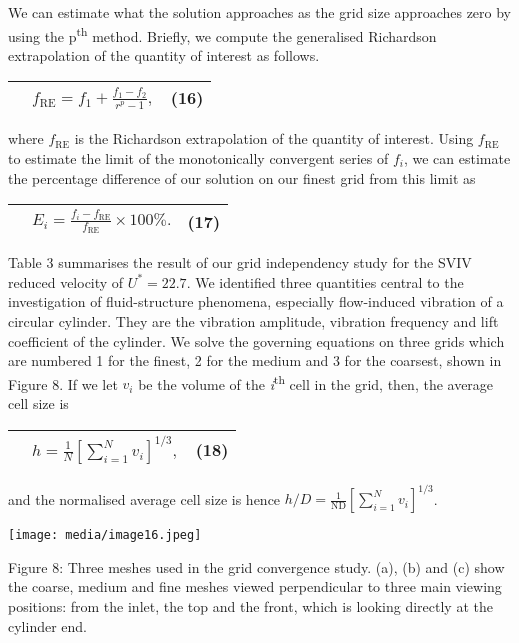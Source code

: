 \documentclass[]{article}
\begin{document}
We can estimate what the solution approaches as the grid size approaches
zero by using the p\textsuperscript{th} method. Briefly, we compute the
generalised Richardson extrapolation of the quantity of interest as
follows.

\begin{longtable}[]{@{}lll@{}}
\toprule
& \(f_{\text{RE}} = f_{1} + \frac{f_{1} - f_{2}}{r^{p} - 1},\) &
(16)\tabularnewline
\midrule
\endhead
\bottomrule
\end{longtable}

where \(f_{\text{RE}}\) is the Richardson extrapolation of the quantity
of interest. Using \(f_{\text{RE}}\) to estimate the limit of the
monotonically convergent series of \(f_{i}\), we can estimate the
percentage difference of our solution on our finest grid from this limit
as

\begin{longtable}[]{@{}lll@{}}
\toprule
& \(E_{i} = \frac{f_{i} - f_{\text{RE}}}{f_{\text{RE}}} \times 100\%.\)
& (17)\tabularnewline
\midrule
\endhead
\bottomrule
\end{longtable}

Table 3 summarises the result of our grid independency study for the
SVIV reduced velocity of \(U^{*} = 22.7\). We identified three
quantities central to the investigation of fluid-structure phenomena,
especially flow-induced vibration of a circular cylinder. They are the
vibration amplitude, vibration frequency and lift coefficient of the
cylinder. We solve the governing equations on three grids which are
numbered 1 for the finest, 2 for the medium and 3 for the coarsest,
shown in Figure 8. If we let \(v_{i}\) be the volume of the
\emph{i}\textsuperscript{th} cell in the grid, then, the average cell
size is

\begin{longtable}[]{@{}lll@{}}
\toprule
&
\(h = \frac{1}{N}\left\lbrack \sum_{i = 1}^{N}v_{i} \right\rbrack^{1/3},\)
& (18)\tabularnewline
\midrule
\endhead
\bottomrule
\end{longtable}

and the normalised average cell size is hence
\(h/D = \frac{1}{\text{ND}}\left\lbrack \sum_{i = 1}^{N}v_{i} \right\rbrack^{1/3}\).

\texttt{[image: media/image16.jpeg]}

\protect\hypertarget{_Ref40997559}{}{\protect\hypertarget{_Toc41048831}{}{}}Figure
8: Three meshes used in the grid convergence study. (a), (b) and (c)
show the coarse, medium and fine meshes viewed perpendicular to three
main viewing positions: from the inlet, the top and the front, which is
looking directly at the cylinder end.
\end{document}
